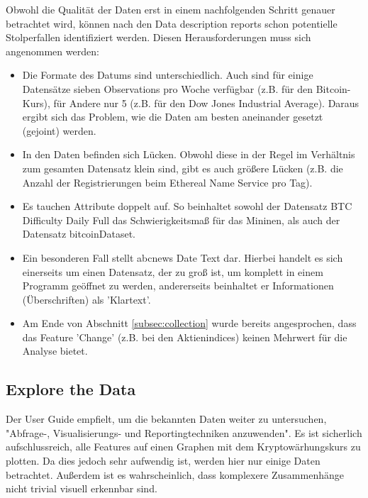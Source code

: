 Obwohl die Qualität der Daten erst in einem nachfolgenden Schritt genauer betrachtet wird, können nach den Data description reports schon potentielle Stolperfallen  identifiziert werden. Diesen Herausforderungen muss sich angenommen werden:
\begin{itemize}
\item Die Formate des Datums sind unterschiedlich. Auch sind für einige Datensätze sieben Observations pro Woche verfügbar (z.B. für den Bitcoin-Kurs), für Andere nur 5 (z.B. für den Dow Jones Industrial Average). Daraus ergibt sich das Problem, wie die Daten am besten aneinander gesetzt (gejoint) werden.
\item In den Daten befinden sich Lücken. Obwohl diese in der Regel im Verhältnis zum gesamten Datensatz klein sind, gibt es auch größere Lücken (z.B. die Anzahl der Registrierungen beim Ethereal Name Service pro Tag).
\item Es tauchen Attribute doppelt auf. So beinhaltet sowohl der Datensatz BTC \textunderscore Difficulty \textunderscore Daily \textunderscore Full das Schwierigkeitsmaß für das Mininen, als auch der Datensatz bitcoinDataset. 
\item Ein besonderen Fall stellt abcnews \textunderscore Date \textunderscore Text dar. Hierbei handelt es sich einerseits um einen Datensatz, der zu groß ist, um komplett in einem Programm geöffnet zu werden, andererseits beinhaltet er Informationen (Überschriften) als 'Klartext'. 
\item Am Ende von Abschnitt \ref{subsec:collection} wurde bereits angesprochen, dass das Feature 'Change' (z.B. bei den Aktienindices) keinen Mehrwert für die Analyse bietet.
\end{itemize}

\subsection{Explore the Data} \label{subsec:explore}
Der User Guide empfielt, um die bekannten Daten weiter zu untersuchen, "Abfrage-, Visualisierungs- und Reportingtechniken anzuwenden"\citep[S.~40; eigene Übersetzung]{chapman_crisp-dm_2000}. Es ist sicherlich aufschlussreich, alle Features auf einen Graphen mit dem Kryptowärhungskurs zu plotten. Da dies jedoch sehr aufwendig ist, werden hier nur einige Daten betrachtet. Außerdem ist es wahrscheinlich, dass komplexere Zusammenhänge nicht trivial visuell erkennbar sind.\newline

